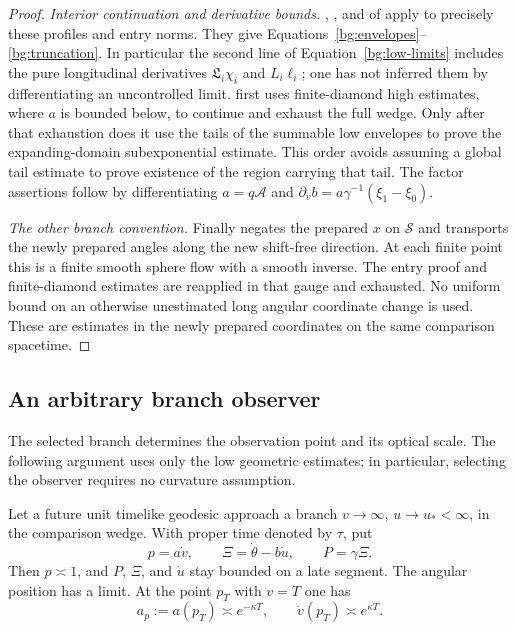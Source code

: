\begin{proof}
\emph{Interior continuation and derivative bounds.}
, , and  of \cite{Foundation} apply
to precisely these profiles and entry norms.  They give
Equations~\eqref{bg:envelopes}--\eqref{bg:truncation}.  In particular
the second line of Equation~\eqref{bg:low-limits} includes the pure
longitudinal derivatives $\mathfrak L_i\chi_i$ and $L_i\ell_i$;
one has not inferred them by differentiating an uncontrolled limit.
 first uses finite-diamond
high estimates, where $a$ is bounded below, to continue and exhaust
the full wedge.  Only after that exhaustion does it use the tails of
the summable low envelopes to prove the expanding-domain
subexponential estimate.  This order avoids assuming a global tail
estimate to prove existence of the region carrying that tail.
The factor assertions follow by differentiating $a=q\mathcal A$ and
$\partial_vb=a\gamma^{-1}(\xi_1-\xi_0)$.

\emph{The other branch convention.}
Finally \cite[]{Foundation} negates
the prepared $x$ on $\mathcal S$ and transports the newly prepared
angles along the new shift-free direction.  At each finite point
this is a finite smooth sphere flow with a smooth inverse.
The entry proof and finite-diamond estimates are reapplied in that
gauge and exhausted.  No uniform bound on an otherwise unestimated
long angular coordinate change is used. These are estimates in the
newly prepared coordinates on the same comparison spacetime.
\end{proof}

\subsection{An arbitrary branch observer}

The selected branch determines the observation point and its optical
scale. The following argument uses only the low geometric estimates;
in particular, selecting the observer requires no curvature assumption.

\begin{lemma}
\label{bg:branch}
Let a future unit timelike geodesic approach a branch
$v\to\infty$, $u\to u_*<\infty$, in the comparison wedge.
With proper time denoted by $\tau$, put
\[
 p=a\dot v,\qquad \Xi=\dot\theta-b\dot u,\qquad P=\gamma\Xi.
\]
Then $p\asymp1$, and $P$, $\Xi$, and $\dot u$ stay bounded on
a late segment.  The angular position has a limit.  At the point
$p_T$ with $v=T$ one has
\begin{equation}\label{bg:branch-scales}
             a_p:=a(p_T)\asymp e^{-\kappa T},
             \qquad \dot v(p_T)\asymp e^{\kappa T}.
\end{equation}
\end{lemma}

